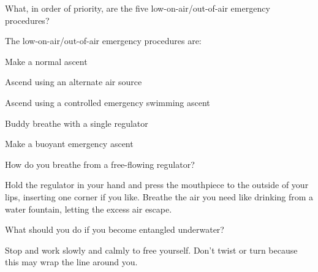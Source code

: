 	\begin{qanda}
		\begin{question}
What, in order of priority, are the five low-on-air/out-of-air emergency procedures?
		\end{question}

		\begin{answer}
The low-on-air/out-of-air emergency procedures are:
			\begin{nospacenumberedlist}
				\item Make a normal ascent
				\item Ascend using an alternate air source
				\item Ascend using a controlled emergency swimming ascent
				\item Buddy breathe with a single regulator
				\item Make a buoyant emergency ascent
			\end{nospacenumberedlist}
		\end{answer}
	\end{qanda}

	\begin{qanda}
		\begin{question}
How do you breathe from a free-flowing regulator?
		\end{question}

		\begin{answer}
Hold the regulator in your hand and press the mouthpiece to the outside of your lips, inserting one corner if you like.  Breathe the air you need like drinking from a water fountain, letting the excess air escape.
		\end{answer}
	\end{qanda}

	\begin{qanda}
		\begin{question}
What should you do if you become entangled underwater?
		\end{question}

		\begin{answer}
Stop and work slowly and calmly to free yourself.  Don't twist or turn because this may wrap the line around you.
		\end{answer}
	\end{qanda}

